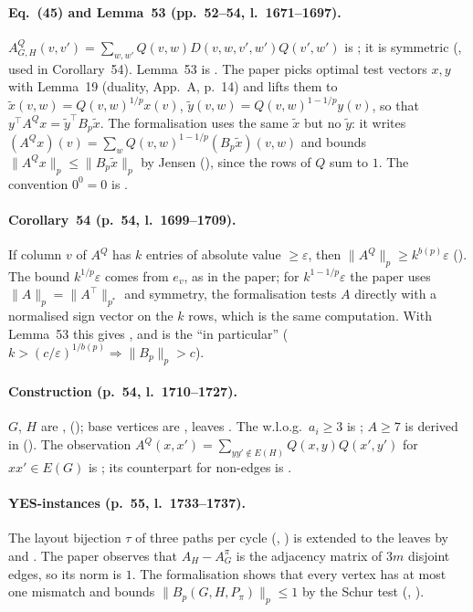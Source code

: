 \paragraph{Eq.~(45) and Lemma~53 (pp.~52--54, l.~1671--1697).} $A^Q_{G,H}(v,v')=\sum_{w,w'}Q(v,w)D(v,w,v',w')Q(v',w')$
is ; it is symmetric (, used in Corollary~54). Lemma~53 is
. The paper picks optimal test vectors $x,y$ with Lemma~19 (duality, App.~A, p.~14) and lifts them to
$\tilde x(v,w)=Q(v,w)^{1/p}x(v)$, $\tilde y(v,w)=Q(v,w)^{1-1/p}y(v)$, so that $y^\top A^Qx=\tilde y^\top B_p\tilde x$.
The formalisation uses the same $\tilde x$ but no $\tilde y$: it writes
$(A^Qx)(v)=\sum_wQ(v,w)^{1-1/p}(B_p\tilde x)(v,w)$ and bounds $\|A^Qx\|_p\le\|B_p\tilde x\|_p$ by Jensen
(), since the rows of $Q$ sum to $1$. The convention $0^0=0$ is .

\paragraph{Corollary~54 (p.~54, l.~1699--1709).} If column $v$ of $A^Q$ has $k$ entries of absolute value
$\ge\varepsilon$, then $\|A^Q\|_p\ge k^{b(p)}\varepsilon$ (). The bound
$k^{1/p}\varepsilon$ comes from $e_v$, as in the paper; for $k^{1-1/p}\varepsilon$ the paper uses
$\|A\|_p=\|A^\top\|_{p^*}$ and symmetry, the formalisation tests $A$ directly with a normalised sign vector on
the $k$ rows, which is the same computation. With Lemma~53 this gives , and
 is the ``in particular'' ($k>(c/\varepsilon)^{1/b(p)}\Rightarrow\|B_p\|_p>c$).

\paragraph{Construction (p.~54, l.~1710--1727).} $G$, $H$ are , 
(); base vertices are , leaves . The w.l.o.g.\ $a_i\ge3$ is
; $A\ge7$ is derived in  (). The observation
$A^Q(x,x')=\sum_{yy'\notin E(H)}Q(x,y)Q(x',y')$ for $xx'\in E(G)$ is ; its
counterpart for non-edges is .

\paragraph{YES-instances (p.~55, l.~1733--1737).} The layout bijection $\tau$ of three paths per cycle
(, ) is extended to the leaves by
 and . The paper observes that $A_H-A^\pi_G$ is the
adjacency matrix of $3m$ disjoint edges, so its norm is $1$. The formalisation shows that every vertex has
at most one mismatch and bounds $\|B_p(G,H,P_\pi)\|_p\le1$ by the Schur test
(, ).

